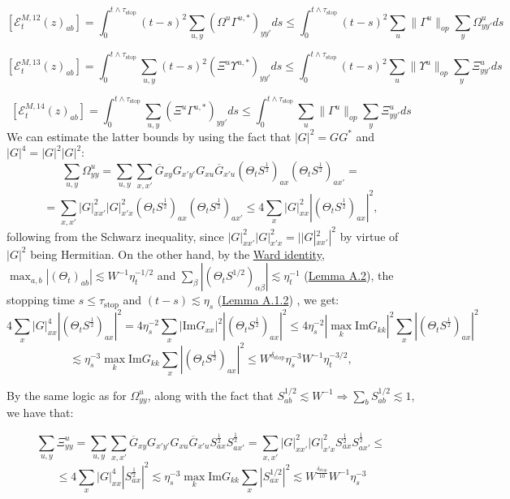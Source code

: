 \documentclass[11pt]{article}
\newcommand{\sto}{\text{stop}}
\begin{document}
$$\left[\mathcal{E}_{t}^{M, 12}(z)_{ab}\right] = \int_0^{t\wedge \tau_\sto} (t-s)^2\sum_{u, y} (\Omega^u\Gamma^{u, *})_{yy'}ds\leq \int_0^{t\wedge \tau_\sto} (t-s)^2\sum_u \|\Gamma^u\|_{op}\sum_y \Omega_{yy'}^uds$$

$$\left[\mathcal{E}_{t}^{M, 13}(z)_{ab}\right] = \int_0^{t\wedge \tau_\sto} \sum_{u, y} (t-s)^2(\Xi^u\Upsilon^{u, *})_{yy'}ds \leq  \int_0^{t\wedge \tau_\sto} (t-s)^2\sum_u \|\Upsilon^u\|_{op}\sum_y \Xi_{yy'}^uds$$

$$\left[\mathcal{E}_{t}^{M, 14}(z)_{ab}\right] = \int_0^{t\wedge \tau_\sto} \sum_{u, y} (\Xi^u\Gamma^{u, *})_{yy'}ds\leq \int_0^{t\wedge \tau_\sto} \sum_u \|\Gamma^u\|_{op}\sum_y \Xi_{yy'}^uds$$
We can estimate the latter bounds by using the fact that $\vert G\vert^2 = GG^*$ and $|G|^4=|G|^2|G|^2$:
$$\sum_{u, y}\Omega_{yy}^u=\sum_{u,y}\sum_{x,x'} \overline{G}_{xy} G_{x'y'} G_{xu} \overline{G}_{x'u} (\Theta_t S^{\frac{1}{2}})_{ax} (\Theta_t S^{\frac{1}{2}})_{ax'} =$$
$$= \sum_{x, x'}|G|^2_{xx'}|{G}|^2_{x'x} (\Theta_t S^{\frac{1}{2}})_{ax} (\Theta_t S^{\frac{1}{2}})_{ax'}\leq 4 \sum_{x}|G|_{xx}^2 |(\Theta_t S^{\frac{1}{2}})_{ax}|^2,$$
following from the Schwarz inequality, since $|G|_{xx'}^2|G|^2_{x'x}=||G|_{xx'}^2|^2$ by virtue of $|G|^2$ being Hermitian. On the other hand, by the \hyperref[ward]{Ward identity}, $\max_{a, b}|(\Theta_t)_{ab}|\lesssim W^{-1}\eta_t^{-1/2}$ and $\sum_\beta |(\Theta_t S^{1/2})_{\alpha\beta}|\lesssim \eta_t^{-1}$ (\hyperref[lemma-a2]{Lemma A.2}), the stopping time $s\leq \tau_\sto$ and $(t-s)\lesssim \eta_s$ (\hyperref[lemma-a21]{Lemma A.1.2}) , we get: $$4 \sum_{x}|G|_{xx}^4 |(\Theta_t S^{\frac{1}{2}})_{ax}|^2=4 \eta_s^{-2}\sum_x|\text{Im}G_{xx}|^2|(\Theta_t S^{\frac{1}{2}})_{ax}|^2\leq 4 \eta_s^{-2}|\max_{k}\text{Im}G_{kk}|^2\sum_x|(\Theta_t S^{\frac{1}{2}})_{ax}|^2$$
$$\lesssim\eta_s^{-3}\max_k \text{Im}G_{kk}\sum_{x} |(\Theta_t S^{\frac{1}{2}})_{ax}|^2\leq W^{\delta_\sto}\eta_s^{-3}W^{-1}\eta_t^{-3/2},$$

\noindent By the same logic as for $\Omega^u_{yy}$, along with the fact that $S_{ab}^{1/2}\lesssim W^{-1}\Rightarrow \sum_b S_{ab}^{1/2} \lesssim 1$, we have that: 

$$\sum_{u, y}\Xi_{yy}^u=\sum_{u,y}\sum_{x,x'} \overline{G}_{xy} G_{x'y'} G_{xu} \overline{G}_{x'u} S^{\frac{1}{2}}_{ax} S^{\frac{1}{2}}_{ax'} = \sum_{x, x'}|G|^2_{xx'}|{G}|^2_{x'x} S^{\frac{1}{2}}_{ax} S^{\frac{1}{2}}_{ax'}\leq $$
$$\leq 4 \sum_{x}|G|_{xx}^4 |S^{\frac{1}{2}}_{ax}|^2\lesssim \eta_s^{-3}\max_k\text{Im}G_{kk}\sum_x|S_{ax}^{1/2}|^2\lesssim W^{\frac{\delta_\sto}{10}}W^{-1}\eta_s^{-3}$$
\end{document}

